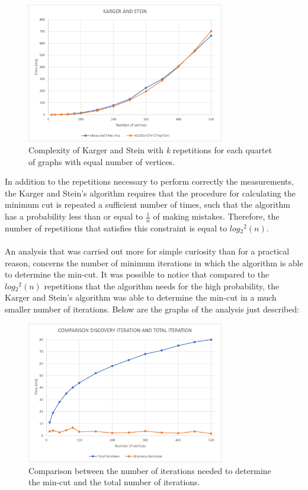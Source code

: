 \begin{figure}[H]
	\centering
	\includegraphics[width=0.77\textwidth]{./img/Karger_Stein}
	\caption{Complexity of Karger and Stein with \textit{k} repetitions for each quartet of graphs with equal number of vertices.}
	\label{fig:kargerstein}
\end{figure}
\noindent
In addition to the repetitions necessary to perform correctly the measurements, the Karger and Stein's algorithm requires that the procedure for calculating the minimum cut is repeated a sufficient number of times, such that the algorithm has a probability less than or equal to \(\frac{1}{n}\) of making mistakes. Therefore, the number of repetitions that satisfies this constraint is equal to $log{_2}^2(n)$.\\ \\ \noindent
An analysis that was carried out more for simple curiosity than for a practical reason, concerns the number of minimum iterations in which the algorithm is able to determine the min-cut. It was possible to notice that compared to the $log{_2}^2(n)$ repetitions that the algorithm needs for the high probability, the Karger and Stein's algorithm was able to determine the min-cut in a much smaller number of iterations. Below are the graphs of the analysis just described:
\begin{figure}[H]
	\centering
	\includegraphics[width=0.77\textwidth]{./img/ComparisonTotalDiscoveryIteration}
	\caption{Comparison between the number of iterations needed to determine the min-cut and the total number of iterations.}
	\label{fig:kargerComparisonIteration}
\end{figure}
